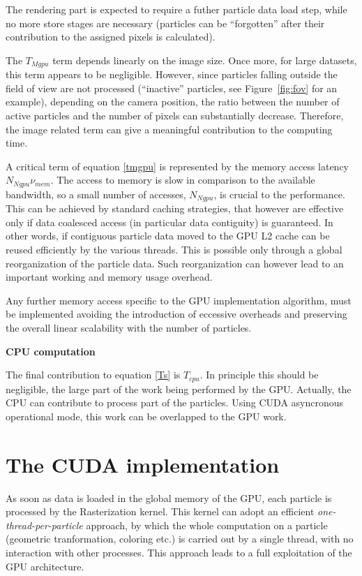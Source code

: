\documentclass[11pt]{article}
\begin{document}
The rendering part is expected to require a futher particle data load step, while no more store 
stages are necessary (particles can be ``forgotten'' after their contribution to the assigned pixels 
is calculated).

The $T_{Mgpu}$ term depends linearly on the image size. Once more, 
for large datasets, this term appears to be negligible. However, since
particles falling outside the field of view are not processed (``inactive'' particles,
see Figure~\ref{fig:fov} for an example),
depending on the camera position, the ratio between the number of active particles
and the number of pixels can substantially decrease. Therefore, 
the image related term can give a meaningful contribution to
the computing time. 

A critical term of equation \eqref{tmgpu} is represented by the memory access
latency $N_{Ngpu} \nu_{mem}$. The access to memory is slow in comparison to
the available bandwidth, so a small number of accesses, $N_{Ngpu}$, is crucial
to the performance. This can be achieved by standard caching strategies, that
however are effective only if data coalesced access (in particular data contiguity) is guaranteed. In other words,
if contiguous particle data moved to the GPU L2 cache can be reused efficiently
by the various threads. This is possible only through a global reorganization 
of the particle data. Such reorganization can however lead to an important
working and memory usage overhead.

Any further memory access specific to the GPU implementation algorithm,
must be implemented 
avoiding the introduction of eccessive overheads and preserving the overall
linear scalability with the number of particles.

\medskip
\noindent
{\bf CPU computation}

\noindent
The final contribution to equation \eqref{Ts} is $T_{cpu}$. In principle this should be negligible, 
the large part of the work being performed by the GPU. Actually, the CPU
can contribute to process part of the particles. Using
CUDA asyncronous operational mode, this work can be overlapped 
to the GPU work. 

\section{The CUDA implementation}
\label{sec:implementation}

As soon as data is loaded in the global memory of the GPU, each particle is processed 
by the Rasterization kernel. This kernel can adopt an efficient  
{\it one-thread-per-particle} approach, by which the whole computation on 
a particle (geometric tranformation, coloring etc.) is carried out
by a single thread, with no interaction with other processes.  
This approach leads to a full exploitation of the GPU architecture. 
\end{document}
